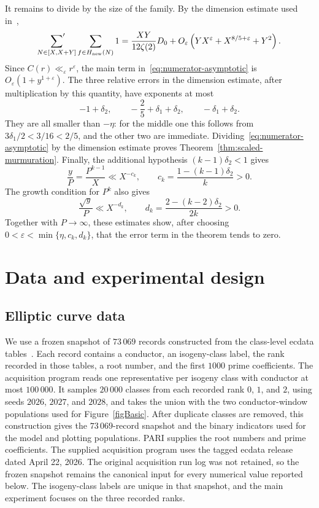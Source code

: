 \documentclass[12pt,reqno]{amsart}
\numberwithin{equation}{section}
\theoremstyle{plain}
\theoremstyle{definition}
\theoremstyle{remark}
\begin{document}
It remains to divide by the size of the family.
By the dimension estimate used in~\cite[\S3.4]{Zubrilina2025},
\begin{equation*}
\sideset{}{'}\sum_{N\in[X,X+Y]}
\sum_{f\in H_{\mathrm{new}}(N)}1
=
\frac{XY}{12\zeta(2)}D_0
+
O_\varepsilon\left(
YX^\varepsilon+X^{8/5+\varepsilon}+Y^2
\right).
\end{equation*}
Since $C(r)\ll_\varepsilon r^\varepsilon$, the main term in~\eqref{eq:numerator-asymptotic} is $O_\varepsilon(1+y^{1+\varepsilon})$.
The three relative errors in the dimension estimate, after multiplication by this quantity, have exponents at most
\[
-1+\delta_2,\qquad
-\frac25+\delta_1+\delta_2,\qquad
-\delta_1+\delta_2.
\]
They are all smaller than $-\eta$: for the middle one this follows from $3\delta_1/2<3/16<2/5$, and the other two are immediate.
Dividing~\eqref{eq:numerator-asymptotic} by the dimension estimate proves Theorem~\ref{thm:scaled-murmuration}.
Finally, the additional hypothesis $(k-1)\delta_2<1$ gives
\[
\frac yP=\frac{P^{k-1}}X
\ll X^{-c_k},
\qquad
c_k=\frac{1-(k-1)\delta_2}{k}>0.
\]
The growth condition for $P^k$ also gives
\[
\frac{\sqrt y}{P}
\ll X^{-d_k},
\qquad
d_k=\frac{2-(k-2)\delta_2}{2k}>0.
\]
Together with $P\to\infty$, these estimates show, after choosing $0<\varepsilon<\min\{\eta,c_k,d_k\}$, that the error term in the theorem tends to zero.



\section{Data and experimental design}
\label{secDesign}

\subsection{Elliptic curve data}

We use a frozen snapshot of $73\,069$ records constructed from the class-level ecdata tables~\cite{CremonaEcdata}.  Each record contains a conductor, an isogeny-class label, the rank recorded in those tables, a root number, and the first $1000$ prime coefficients.
The acquisition program reads one representative per isogeny class with conductor at most $100\,000$.
It samples $20\,000$ classes from each recorded rank $0$, $1$, and $2$, using seeds $2026$, $2027$, and $2028$, and takes the union with the two conductor-window populations used for Figure~\ref{figBasic}.
After duplicate classes are removed, this construction gives the $73\,069$-record snapshot and the binary indicators used for the model and plotting populations.
PARI supplies the root numbers and prime coefficients.
The supplied acquisition program uses the tagged ecdata release dated April 22, 2026.
The original acquisition run log was not retained, so the frozen snapshot remains the canonical input for every numerical value reported below.
The isogeny-class labels are unique in that snapshot, and the main experiment focuses on the three recorded ranks.
\end{document}
